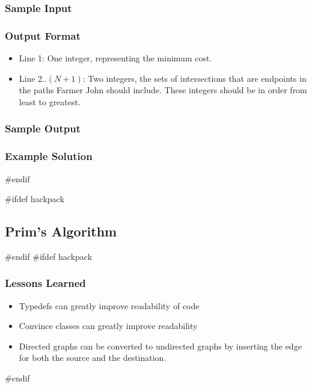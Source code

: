 \subsubsection{Sample Input}
\subsubsection{Output Format}
\begin{itemize}
	\item Line 1: One integer, representing the minimum cost.
	\item Line 2..$(N+1)$: Two integers, the sets of intersections that are endpoints in the paths Farmer John should include. These integers should be in order from least to greatest.
\end{itemize}
\subsubsection{Sample Output}
\subsubsection{Example Solution}
#endif

#ifdef hackpack
\subsection{Prim's Algorithm}
#endif
#ifdef hackpack
\subsubsection{Lessons Learned}
\begin{itemize}
	\item Typedefs can greatly improve readability of code
	\item Convince classes can greatly improve readability
	\item Directed graphs can be converted to undirected graphs by inserting the edge for both the source and the destination.
\end{itemize}
#endif

